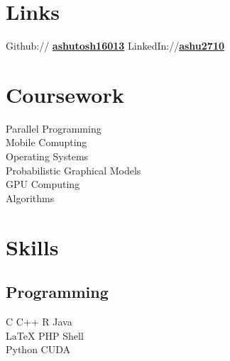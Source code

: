 \documentclass[letterpaper]{deedy-resume} %
\begin{document}
\begin{minipage}[t]{0.33\textwidth}

	     \sectionspace %


	     \section{Links} 

Github:// \href{https://github.com/ashutosh16013}{\bf ashutosh16013}
LinkedIn://\href{https://www.linkedin.com/in/ashu2710/}{\bf ashu2710}

\sectionspace %


\section{Coursework}
Parallel Programming \\
		 Mobile Comupting \\
		 Operating Systems \\
		 Probabilistic Graphical Models \\
		 GPU Computing \\ 
		 Algorithms

		 \sectionspace %


		 \section{Skills}

		 \subsection{Programming}

		 C \textbullet{} C++ \textbullet{} R \textbullet{} Java \\
			 \LaTeX \textbullet{} PHP  \textbullet{} Shell\\
				 Python \textbullet{} CUDA


\end{minipage}
\end{document}
